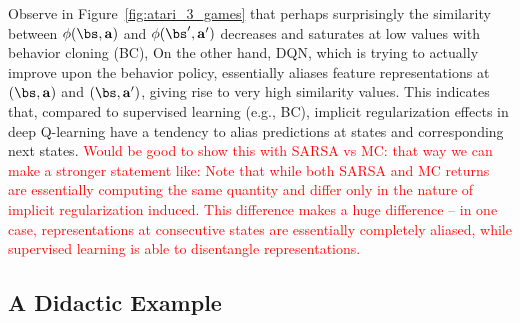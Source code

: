 Observe in  Figure~\ref{fig:atari_3_games} that perhaps surprisingly the similarity between $\phi(\bs, \mathbf{a})$ and $\phi(\bs', \mathbf{a}')$ decreases and saturates at low values with behavior cloning (BC),
On the other hand, DQN, which is trying to actually improve upon the behavior policy, essentially aliases
feature representations at $(\bs, \mathbf{a})$ and $(\bs, \mathbf{a}')$, giving rise to very high similarity values.
This indicates that, compared to supervised learning (e.g., BC), implicit regularization effects in deep Q-learning have a tendency to alias predictions at states and corresponding next states. \textcolor{red}{Would be good to show this with SARSA vs MC: that way we can make a stronger statement like: Note that while both SARSA and MC returns are essentially computing the same quantity and differ only in the nature of implicit regularization induced. This difference makes a huge difference -- in one case, representations at consecutive states are essentially completely aliased, while supervised learning is able to disentangle representations.}

\fi

\subsection{A Didactic Example}
\label{sec:empirical_analysis}

